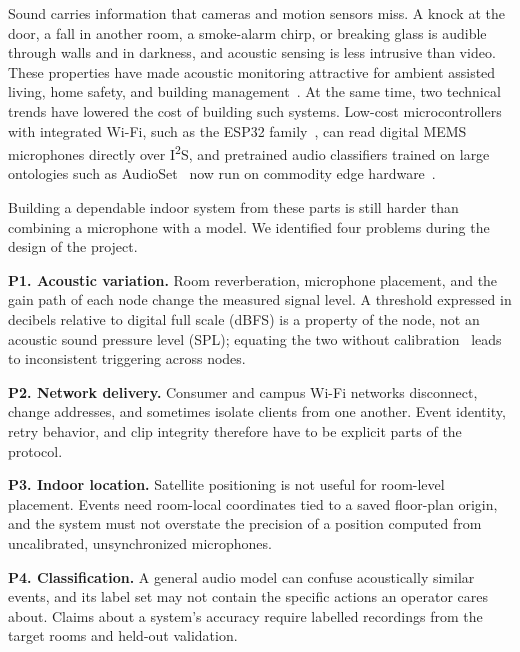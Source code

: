 \documentclass[conference]{IEEEtran}
\begin{document}
Sound carries information that cameras and motion sensors miss. A knock at the door, a fall in another room, a smoke-alarm chirp, or breaking glass is audible through walls and in darkness, and acoustic sensing is less intrusive than video. These properties have made acoustic monitoring attractive for ambient assisted living, home safety, and building management~\cite{vacher2011,popescu2008,carovia2022}. At the same time, two technical trends have lowered the cost of building such systems. Low-cost microcontrollers with integrated Wi-Fi, such as the ESP32 family~\cite{esp32s3ds}, can read digital MEMS microphones directly over I\textsuperscript{2}S, and pretrained audio classifiers trained on large ontologies such as AudioSet~\cite{gemmeke2017} now run on commodity edge hardware~\cite{hershey2017,kong2020,gong2021}.

Building a dependable indoor system from these parts is still harder than combining a microphone with a model. We identified four problems during the design of the project.

\textbf{P1. Acoustic variation.} Room reverberation, microphone placement, and the gain path of each node change the measured signal level. A threshold expressed in decibels relative to digital full scale (dBFS) is a property of the node, not an acoustic sound pressure level (SPL); equating the two without calibration~\cite{iec61672} leads to inconsistent triggering across nodes.

\textbf{P2. Network delivery.} Consumer and campus Wi-Fi networks disconnect, change addresses, and sometimes isolate clients from one another. Event identity, retry behavior, and clip integrity therefore have to be explicit parts of the protocol.

\textbf{P3. Indoor location.} Satellite positioning is not useful for room-level placement. Events need room-local coordinates tied to a saved floor-plan origin, and the system must not overstate the precision of a position computed from uncalibrated, unsynchronized microphones.

\textbf{P4. Classification.} A general audio model can confuse acoustically similar events, and its label set may not contain the specific actions an operator cares about. Claims about a system's accuracy require labelled recordings from the target rooms and held-out validation.
\end{document}

